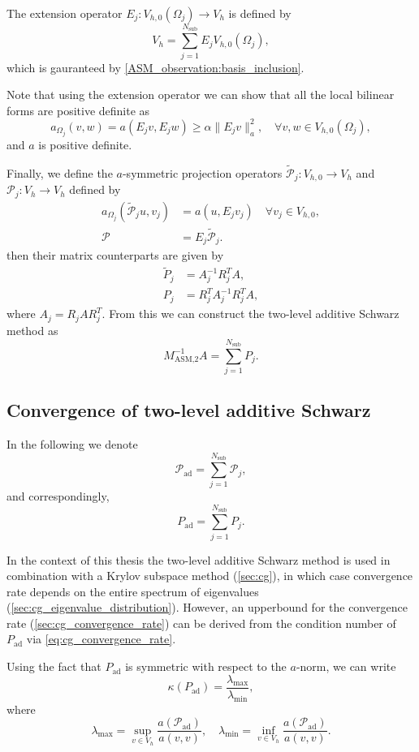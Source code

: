 The extension operator $E_j: V_{h,0}(\Omega_j) \rightarrow V_h$ is defined by 
\[
    V_h = \sum_{j=1}^{N_{\text{sub}}} E_j V_{h,0}(\Omega_j),
\]
which is gauranteed by \cref{ASM_observation:basis_inclusion}. 

Note that using the extension operator we can show that all the local bilinear forms are positive definite as
\[
    a_{\Omega_j}(v,w) = a(E_j v, E_j w) \geq \alpha \| E_j v \|_a^2, \quad \forall v,w\in V_{h,0}(\Omega_j),
\]
and $a$ is positive definite. 

Finally, we define the $a$-symmetric projection operators $\tilde{\mathcal{P}}_j: V_{h,0} \rightarrow V_h$ and $\mathcal{P}_j:V_h \rightarrow V_h$ defined by 
\begin{align*}
    a_{\Omega_j}(\tilde{\mathcal{P}}_j u, v_j) &= a(u, E_j v_j) \quad \forall v_j \in V_{h,0},\\
    \mathcal{P} &= E_j \tilde{\mathcal{P}}_j.
\end{align*}
then their matrix counterparts are given by 
\begin{align*}
    \tilde{P}_j &=  A_j^{-1} R_j^T A,\\
    P_j &= R_j^T A_j^{-1} R_j^T A,
\end{align*}
where $A_j = R_j A R_j^T$. From this we can construct the two-level additive Schwarz method as
\begin{equation}
    M_{\text{ASM,2}}^{-1} A = \sum_{j=1}^{N_{\text{sub}}} P_j.
    \label{eq:two_level_ASM_projections}
\end{equation}

\subsection{Convergence of two-level additive Schwarz}\label{sec:two_level_ASM_convergence}
In the following we denote
\[
    \mathcal{P}_{\text{ad}} = \sum_{j=1}^{N_{\text{sub}}} \mathcal{P}_j,
\]
and correspondingly,
\[
    P_{\text{ad}} = \sum_{j=1}^{N_{\text{sub}}} P_j.
\]

In the context of this thesis the two-level additive Schwarz method is used in combination with a Krylov subspace method (\cref{sec:cg}), in which case convergence rate depends on the entire spectrum of eigenvalues (\cref{sec:cg_eigenvalue_distribution}). However, an upperbound for the convergence rate (\cref{sec:cg_convergence_rate}) can be derived from the condition number of $P_{\text{ad}}$ via \cref{eq:cg_convergence_rate}. 

Using the fact that $P_{\text{ad}}$ is symmetric with respect to the $a$-norm, we can write
\[
    \kappa(P_{\text{ad}}) = \frac{\lambda_{\text{max}}}{\lambda_{\text{min}}},
\]
where
\[
    \lambda_{\text{max}} = \sup_{v\in V_h} \frac{a(\mathcal{P}_{\text{ad}})}{a(v,v)}, \quad \lambda_{\text{min}} = \inf_{v\in V_h} \frac{a(\mathcal{P}_{\text{ad}})}{a(v,v)}.
\]

